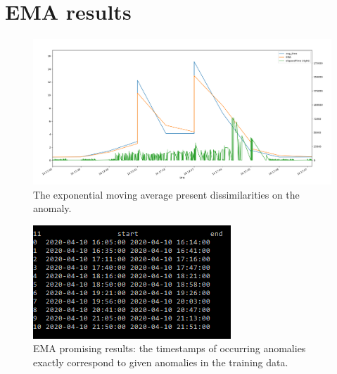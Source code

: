 \documentclass[acmsmall, screen, nonacm]{acmart}
\begin{document}




\newpage
\appendix
\section{EMA results}\label{sec:appendix_ema}
\begin{figure}[h!]
  \centering
  \includegraphics[width=\textwidth]{images/EMA.png}
  \caption{The exponential moving average present dissimilarities on the anomaly.}
  \label{fig:EMA}
\end{figure}

\begin{figure}[h!]
  \centering
  \includegraphics{images/Anomaly_timestamps.png}
  \caption{EMA promising results: the timestamps of occurring anomalies exactly correspond to given anomalies in the training data.}
  \label{fig:anomaly_timestamps}
\end{figure}
\end{document}
